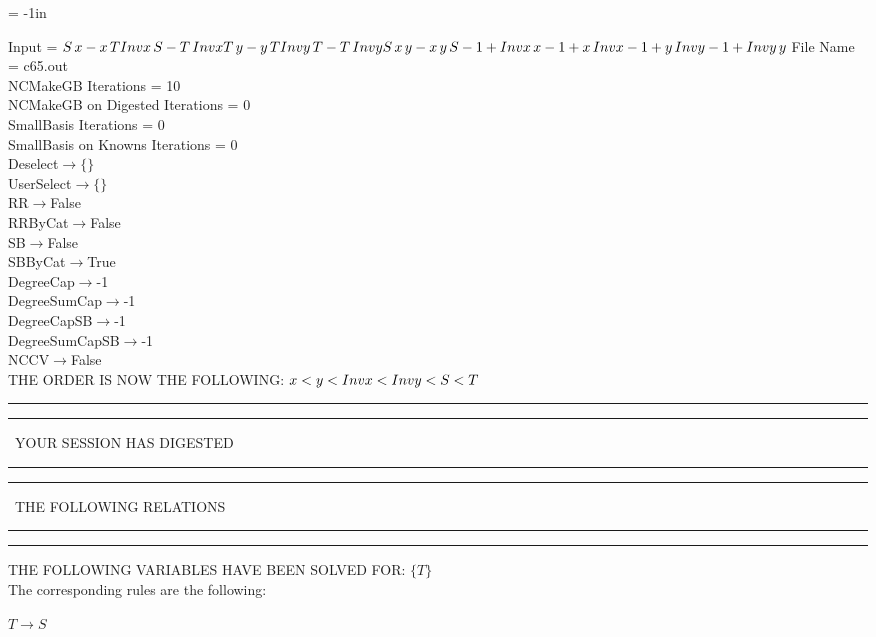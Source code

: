 \voffset = -1in
\evensidemargin 0.1in
\oddsidemargin 0.1in
\textheight 9in
\textwidth 6in

\normalsize
\baselineskip=12pt
\noindent
Input = 
$
\\S\,
 x - x\,
 T\\
Invx\,
 S - T\,
 Invx\\
T\,
 y - y\,
 T\\
Invy\,
 T - T\,
 Invy\\
S\,
 x\,
 y - x\,
 y\,
 S\\
-1 + Invx\,
 x\\
-1 + x\,
 Invx\\
-1 + y\,
 Invy\\
-1 + Invy\,
 y\\
$
File Name = c65.out\\
NCMakeGB Iterations = 10\\
NCMakeGB on Digested Iterations = 0\\
SmallBasis Iterations = 0\\
SmallBasis on Knowns Iterations = 0\\
Deselect$\rightarrow \{\}$\\
UserSelect$\rightarrow \{\}$\\
RR$\rightarrow $False\\
RRByCat$\rightarrow $False\\
SB$\rightarrow $False\\
SBByCat$\rightarrow $True\\
DegreeCap$\rightarrow $-1\\
DegreeSumCap$\rightarrow $-1\\
DegreeCapSB$\rightarrow $-1\\
DegreeSumCapSB$\rightarrow $-1\\
NCCV$\rightarrow $False\\
THE ORDER IS NOW THE FOLLOWING:\hfil\break
$
x<y<Invx<Invy<S<T\\
$
\rule[2pt]{6in}{4pt}\hfil\break
\rule[2pt]{1.879in}{4pt}
\ YOUR SESSION HAS DIGESTED\ 
\rule[2pt]{1.879in}{4pt}\hfil\break
\rule[2pt]{1.923in}{4pt}
\ THE FOLLOWING RELATIONS\ 
\rule[2pt]{1.923in}{4pt}\hfil\break
\rule[2pt]{6in}{4pt}\hfil\break
THE FOLLOWING VARIABLES HAVE BEEN SOLVED FOR:\hfil\break
$\{T\}$
\smallskip\\
The corresponding rules are the following:\smallskip\\
\begin{minipage}{6in}
$
T\rightarrow S
$
\end{minipage}\medskip\\
